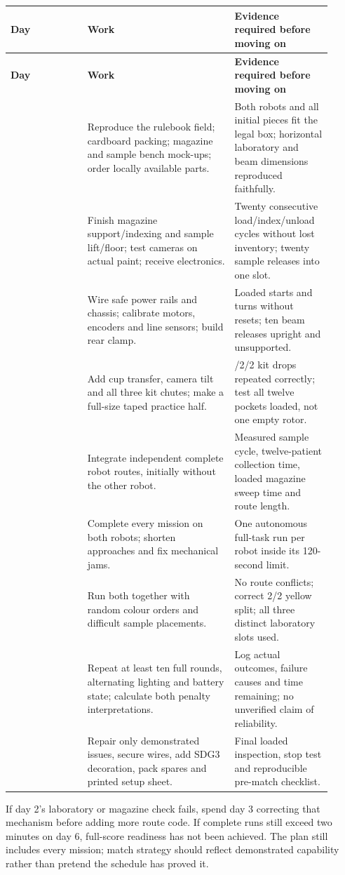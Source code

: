 \documentclass[10pt,a4paper]{article}
\begin{document}
\small\begin{longtable}{@{}>{\raggedright\arraybackslash}p{0.22\linewidth}>{\raggedright\arraybackslash}p{0.42\linewidth}>{\raggedright\arraybackslash}p{0.27\linewidth}@{}}
\toprule
\textbf{Day} & \textbf{Work} & \textbf{Evidence required before moving on} \\
\midrule\endfirsthead
\toprule\textbf{Day} & \textbf{Work} & \textbf{Evidence required before moving on} \\\midrule\endhead
1 & Reproduce the rulebook field; cardboard packing; magazine and sample bench mock-ups; order locally available parts. & Both robots and all initial pieces fit the legal box; horizontal laboratory and beam dimensions reproduced faithfully. \\[3pt]
2 & Finish magazine support/indexing and sample lift/floor; test cameras on actual paint; receive electronics. & Twenty consecutive load/index/unload cycles without lost inventory; twenty sample releases into one slot. \\[3pt]
3 & Wire safe power rails and chassis; calibrate motors, encoders and line sensors; build rear clamp. & Loaded starts and turns without resets; ten beam releases upright and unsupported. \\[3pt]
4 & Add cup transfer, camera tilt and all three kit chutes; make a full-size taped practice half. & 6/2/2 kit drops repeated correctly; test all twelve pockets loaded, not one empty rotor. \\[3pt]
5 & Integrate independent complete robot routes, initially without the other robot. & Measured sample cycle, twelve-patient collection time, loaded magazine sweep time and route length. \\[3pt]
6 & Complete every mission on both robots; shorten approaches and fix mechanical jams. & One autonomous full-task run per robot inside its 120-second limit. \\[3pt]
7 & Run both together with random colour orders and difficult sample placements. & No route conflicts; correct 2/2 yellow split; all three distinct laboratory slots used. \\[3pt]
8 & Repeat at least ten full rounds, alternating lighting and battery state; calculate both penalty interpretations. & Log actual outcomes, failure causes and time remaining; no unverified claim of reliability. \\[3pt]
9 & Repair only demonstrated issues, secure wires, add SDG3 decoration, pack spares and printed setup sheet. & Final loaded inspection, stop test and reproducible pre-match checklist. \\[3pt]
\bottomrule\end{longtable}\normalsize
If day 2's laboratory or magazine check fails, spend day 3 correcting that mechanism before adding more route code. If complete runs still exceed two minutes on day 6, full-score readiness has not been achieved. The plan still includes every mission; match strategy should reflect demonstrated capability rather than pretend the schedule has proved it.
\end{document}

